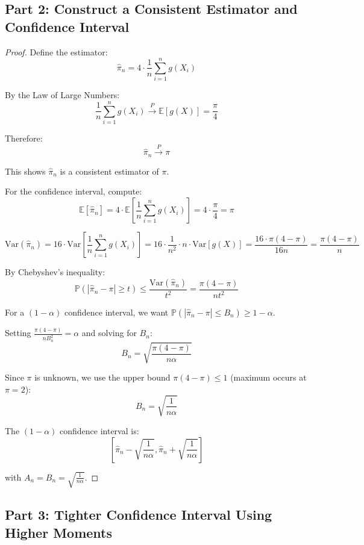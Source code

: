 \documentclass[12pt]{article}
\begin{document}
\subsection*{Part 2: Construct a Consistent Estimator and Confidence Interval}

\begin{proof}
Define the estimator:
\[
\hat{\pi}_n = 4 \cdot \frac{1}{n}\sum_{i=1}^n g(X_i)
\]

By the Law of Large Numbers:
\[
\frac{1}{n}\sum_{i=1}^n g(X_i) \xrightarrow{P} \mathbb{E}[g(X)] = \frac{\pi}{4}
\]

Therefore:
\[
\hat{\pi}_n \xrightarrow{P} \pi
\]

This shows $\hat{\pi}_n$ is a consistent estimator of $\pi$.

For the confidence interval, compute:
\[
\mathbb{E}[\hat{\pi}_n] = 4 \cdot \mathbb{E}\left[\frac{1}{n}\sum_{i=1}^n g(X_i)\right] = 4 \cdot \frac{\pi}{4} = \pi
\]

\[
\text{Var}(\hat{\pi}_n) = 16 \cdot \text{Var}\left[\frac{1}{n}\sum_{i=1}^n g(X_i)\right] = 16 \cdot \frac{1}{n^2} \cdot n \cdot \text{Var}[g(X)] = \frac{16 \cdot \pi(4-\pi)}{16n} = \frac{\pi(4-\pi)}{n}
\]

By Chebyshev's inequality:
\[
\mathbb{P}(|\hat{\pi}_n - \pi| \geq t) \leq \frac{\text{Var}(\hat{\pi}_n)}{t^2} = \frac{\pi(4-\pi)}{nt^2}
\]

For a $(1-\alpha)$ confidence interval, we want $\mathbb{P}(|\hat{\pi}_n - \pi| \leq B_n) \geq 1 - \alpha$.

Setting $\frac{\pi(4-\pi)}{nB_n^2} = \alpha$ and solving for $B_n$:
\[
B_n = \sqrt{\frac{\pi(4-\pi)}{n\alpha}}
\]

Since $\pi$ is unknown, we use the upper bound $\pi(4-\pi) \leq 1$ (maximum occurs at $\pi = 2$):
\[
B_n = \sqrt{\frac{1}{n\alpha}}
\]

The $(1-\alpha)$ confidence interval is:
\[
\boxed{\left[\hat{\pi}_n - \sqrt{\frac{1}{n\alpha}}, \hat{\pi}_n + \sqrt{\frac{1}{n\alpha}}\right]}
\]

with $A_n = B_n = \sqrt{\frac{1}{n\alpha}}$.
\end{proof}

\subsection*{Part 3: Tighter Confidence Interval Using Higher Moments}
\end{document}
